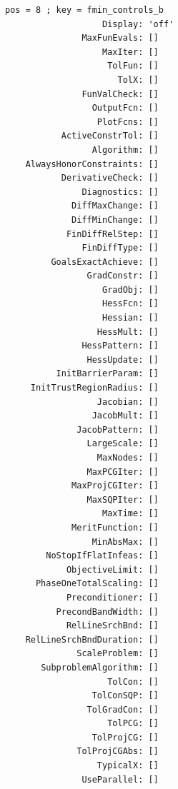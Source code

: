 \documentclass[
]{book}
\begin{document}
\begin{verbatim}
pos = 8 ; key = fmin_controls_b
                   Display: 'off'
               MaxFunEvals: []
                   MaxIter: []
                    TolFun: []
                      TolX: []
               FunValCheck: []
                 OutputFcn: []
                  PlotFcns: []
           ActiveConstrTol: []
                 Algorithm: []
    AlwaysHonorConstraints: []
           DerivativeCheck: []
               Diagnostics: []
             DiffMaxChange: []
             DiffMinChange: []
            FinDiffRelStep: []
               FinDiffType: []
         GoalsExactAchieve: []
                GradConstr: []
                   GradObj: []
                   HessFcn: []
                   Hessian: []
                  HessMult: []
               HessPattern: []
                HessUpdate: []
          InitBarrierParam: []
     InitTrustRegionRadius: []
                  Jacobian: []
                 JacobMult: []
              JacobPattern: []
                LargeScale: []
                  MaxNodes: []
                MaxPCGIter: []
             MaxProjCGIter: []
                MaxSQPIter: []
                   MaxTime: []
             MeritFunction: []
                 MinAbsMax: []
        NoStopIfFlatInfeas: []
            ObjectiveLimit: []
      PhaseOneTotalScaling: []
            Preconditioner: []
          PrecondBandWidth: []
            RelLineSrchBnd: []
    RelLineSrchBndDuration: []
              ScaleProblem: []
       SubproblemAlgorithm: []
                    TolCon: []
                 TolConSQP: []
                TolGradCon: []
                    TolPCG: []
                 TolProjCG: []
              TolProjCGAbs: []
                  TypicalX: []
               UseParallel: []


\end{verbatim}
\end{document}
